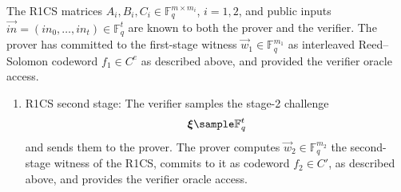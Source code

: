 \begin{protocol}
\label{prot:main}
The R1CS matrices $A_i,B_i,C_i \in \mathbb F_q^{m\times m_i}$, $i=1,2$, and public inputs $\vec{in} = (in_0,\ldots, in_{t})\in \mathbb F_q^t$ are known to both the prover and the verifier. 
The prover has committed to the first-stage witness $\vec w_1\in \mathbb F_q^{m_1}$ as interleaved Reed--Solomon codeword $f_1\in C^e$ as described above, and provided the verifier oracle access.
\begin{enumerate}
\item
\label{i:main:phase:1}
R1CS second stage:
The verifier samples the stage-2 challenge
\[
\vec\xi \sample \mathbb F_q^{t}
\]
and sends them to the prover.
The prover computes $\vec w_2 \in \mathbb F_q^{m_2}$  the second-stage witness of the R1CS, commits to it as codeword $f_2\in C'$, as described above, and provides the verifier oracle access.
%


\end{enumerate}
\end{protocol}
